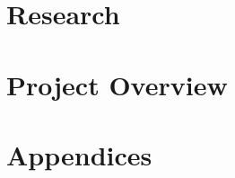 \documentclass[12pt, a4paper]{report}
\title{\BA{Title in Progress...}}
\author{Boris Andrews}
\affil{Mathematical Institute, University of Oxford}
\date{\today}
\begin{document}
    \maketitle
    
    
    \begin{abstract}
    \end{abstract}
    
    
    \newpage
    \tableofcontents
    
    
    \newpage
            
        \part{Research}
            
            
            
            
        \part{Project Overview}
            
            
    
    
    \newpage
        \printbibliography


    \newpage
    \appendix
        \part{Appendices}
            
            
            
\end{document}
